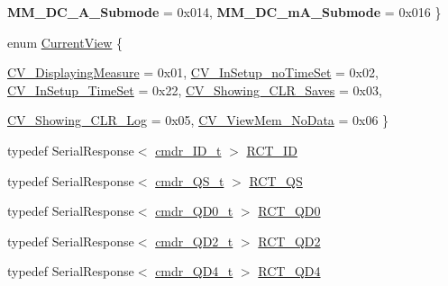 \begin{DoxyCompactItemize}
{\bfseries MM\_\-DC\_\-A\_\-Submode} = 0x014, 
{\bfseries MM\_\-DC\_\-mA\_\-Submode} = 0x016
 \}
\item 
enum \hyperlink{classFluke_1_1Fluke189_a11aaf5d2869234a68421edbb9f836c6f}{CurrentView} \{ \par
\hyperlink{classFluke_1_1Fluke189_a11aaf5d2869234a68421edbb9f836c6fae5c347ff82e9c2f2b53e11653f6fbd5e}{CV\_\-DisplayingMeasure} = 0x01, 
\hyperlink{classFluke_1_1Fluke189_a11aaf5d2869234a68421edbb9f836c6faddc163a5db0566fba8e66beeac6f5f62}{CV\_\-InSetup\_\-noTimeSet} = 0x02, 
\hyperlink{classFluke_1_1Fluke189_a11aaf5d2869234a68421edbb9f836c6faa94135b8352a110010435898bda650f6}{CV\_\-InSetup\_\-TimeSet} = 0x22, 
\hyperlink{classFluke_1_1Fluke189_a11aaf5d2869234a68421edbb9f836c6fa376c8ca6663cd9e5d1b2b1203f381146}{CV\_\-Showing\_\-CLR\_\-Saves} = 0x03, 
\par
\hyperlink{classFluke_1_1Fluke189_a11aaf5d2869234a68421edbb9f836c6fa9a4fbce8291814fc698aa01bc696dbb8}{CV\_\-Showing\_\-CLR\_\-Log} = 0x05, 
\hyperlink{classFluke_1_1Fluke189_a11aaf5d2869234a68421edbb9f836c6fa50f190b26efec7f2ff16d731d4807837}{CV\_\-ViewMem\_\-NoData} = 0x06
 \}
\item 
typedef SerialResponse$<$ \hyperlink{structFluke_1_1Fluke189_1_1cmdr__ID__t}{cmdr\_\-ID\_\-t} $>$ \hyperlink{classFluke_1_1Fluke189_a07788d6f33a7dd54b3a66373b5addded}{RCT\_\-ID}
\item 
typedef SerialResponse$<$ \hyperlink{structFluke_1_1Fluke189_1_1cmdr__QS__t}{cmdr\_\-QS\_\-t} $>$ \hyperlink{classFluke_1_1Fluke189_a9fee860a536aaaa113af0248791e9fef}{RCT\_\-QS}
\item 
typedef SerialResponse$<$ \hyperlink{structFluke_1_1Fluke189_1_1cmdr__QD0__t}{cmdr\_\-QD0\_\-t} $>$ \hyperlink{classFluke_1_1Fluke189_a9a5b405bb506cd2482de2f8bb0bea189}{RCT\_\-QD0}
\item 
typedef SerialResponse$<$ \hyperlink{structFluke_1_1Fluke189_1_1cmdr__QD2__t}{cmdr\_\-QD2\_\-t} $>$ \hyperlink{classFluke_1_1Fluke189_a6dcb8bdb7e09aba26dd95d49f56690cf}{RCT\_\-QD2}
\item 
typedef SerialResponse$<$ \hyperlink{structFluke_1_1Fluke189_1_1cmdr__QD4__t}{cmdr\_\-QD4\_\-t} $>$ \hyperlink{classFluke_1_1Fluke189_a82ebb2c4106833e320c8b18b968a5e22}{RCT\_\-QD4}
\end{DoxyCompactItemize}

